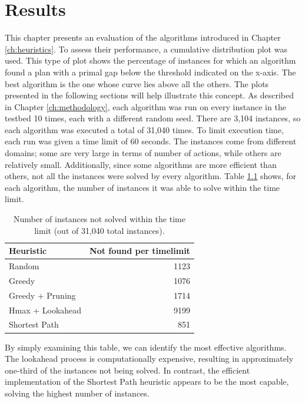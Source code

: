 \chapter{Results}
\label{ch:results}
This chapter presents an evaluation of the algorithms introduced in Chapter \ref{ch:heuristics}.
To assess their performance, a cumulative distribution plot was used.
This type of plot shows the percentage of instances for which an algorithm found a plan with a
primal gap below the threshold indicated on the x-axis.
The best algorithm is the one whose curve lies above all the others.
The plots presented in the following sections will help illustrate this concept.
As described in Chapter \ref{ch:methodology}, each algorithm was run on every instance in the
testbed 10 times, each with a different random seed.
There are 3,104 instances, so each algorithm was executed a total of 31,040 times.
To limit execution time, each run was given a time limit of 60 seconds. The instances
come from different domains; some are very large in terms of number of actions, while others are
relatively small.
Additionally, since some algorithms are more efficient than others, not all the instances
were solved by every algorithm. Table \ref{tab:timelimit} shows, for each algorithm,
the number of instances it was able to solve within the time limit.

\begin{table}[ht]
	\centering
	\begin{tabular}{|l|r|}
		\hline
		\textbf{Heuristic} & \textbf{Not found per timelimit} \\
		\hline
		Random             & 1123                             \\
		Greedy             & 1076                             \\
		Greedy + Pruning   & 1714                             \\
		Hmax + Lookahead   & 9199                             \\
		Shortest Path      & 851                              \\
		\hline
	\end{tabular}
	\caption{Number of instances not solved within the time limit (out of 31,040 total instances).}
	\label{tab:timelimit}
\end{table}

By simply examining this table, we can identify the most effective algorithms.
The lookahead process is computationally expensive, resulting in approximately one-third of the instances not being solved.
In contrast, the efficient implementation of the Shortest Path heuristic appears to be the most capable,
solving the highest number of instances.

